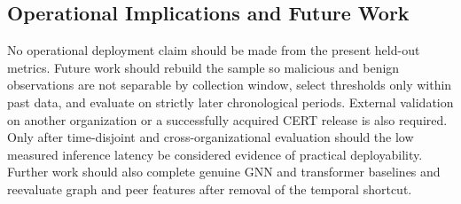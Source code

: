 \subsection{Operational Implications and Future Work}
No operational deployment claim should be made from the present held-out metrics. Future work should rebuild the sample so malicious and benign observations are not separable by collection window, select thresholds only within past data, and evaluate on strictly later chronological periods. External validation on another organization or a successfully acquired CERT release is also required. Only after time-disjoint and cross-organizational evaluation should the low measured inference latency be considered evidence of practical deployability. Further work should also complete genuine GNN and transformer baselines and reevaluate graph and peer features after removal of the temporal shortcut.

\FloatBarrier
